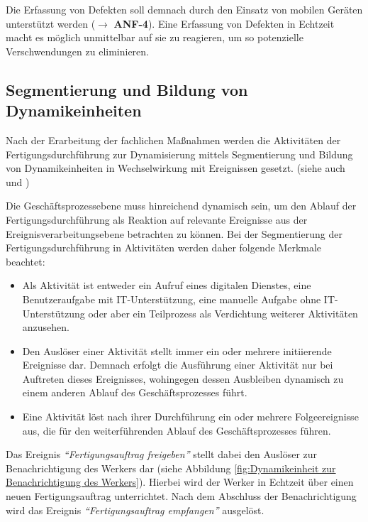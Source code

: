 Die Erfassung von Defekten soll demnach durch den Einsatz von mobilen Geräten unterstützt werden
($\rightarrow$ \textbf{ANF-4}).
Eine Erfassung von Defekten in Echtzeit macht es möglich unmittelbar auf sie zu reagieren, um so potenzielle Verschwendungen zu eliminieren.

\subsection{Segmentierung und Bildung von Dynamikeinheiten}
Nach der Erarbeitung der fachlichen Maßnahmen werden die Aktivitäten der Fertigungsdurchführung zur Dynamisierung mittels Segmentierung und Bildung von Dynamikeinheiten in Wechselwirkung mit Ereignissen gesetzt. 
(siehe auch \citeauthor{Alexopoulou.2008} \cite{Alexopoulou.2008} und \citeauthor{Vidackovic.2014} \cite{Vidackovic.2014}) 

Die Geschäftsprozessebene muss hinreichend dynamisch sein, um den Ablauf der Fertigungsdurchführung als Reaktion auf relevante Ereignisse aus der Ereignisverarbeitungsebene betrachten zu können. 
Bei der Segmentierung der Fertigungsdurchführung in Aktivitäten werden daher folgende Merkmale beachtet:
\begin{itemize}
    \item Als Aktivität ist entweder ein Aufruf eines digitalen Dienstes, eine Benutzeraufgabe mit \ac{IT}-Unterstützung, eine manuelle Aufgabe ohne \ac{IT}-Unterstützung oder aber ein Teilprozess als Verdichtung weiterer Aktivitäten anzusehen.
    \item Den Auslöser einer Aktivität stellt immer ein oder mehrere initiierende Ereignisse dar.  Demnach erfolgt die Ausführung einer Aktivität nur bei Auftreten dieses Ereignisses, wohingegen dessen Ausbleiben dynamisch zu einem anderen Ablauf des Geschäftsprozesses führt.
    \item Eine Aktivität löst nach ihrer Durchführung ein oder mehrere Folgeereignisse aus, die für den weiterführenden Ablauf des Geschäftsprozesses führen.
\end{itemize}

Das Ereignis \textit{\enquote{Fertigungsauftrag freigeben}} stellt dabei den Auslöser zur Benachrichtigung des Werkers dar (siehe Abbildung \ref{fig:Dynamikeinheit zur Benachrichtigung des Werkers}). Hierbei wird der Werker in Echtzeit über einen neuen Fertigungsauftrag unterrichtet. Nach dem Abschluss der Benachrichtigung wird das Ereignis \textit{\enquote{Fertigungsauftrag empfangen}} ausgelöst.

